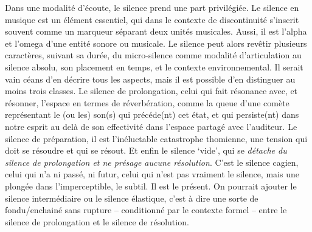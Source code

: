 \documentclass{article}
\begin{document}
Dans une modalité d'écoute, le silence prend une part privilégiée. 
Le silence en musique est un élément essentiel, qui dans le contexte de discontinuité s'inscrit souvent comme un marqueur séparant deux unités musicales. Aussi, il est l'alpha et l'omega d'une entité sonore ou musicale. Le silence peut alors revêtir plusieurs caractères, suivant sa durée, du micro-silence comme modalité d'articulation au silence absolu, son placement en temps, et le contexte environnemental. Il serait vain céans d'en décrire tous les aspects, mais il est possible d'en distinguer au moins trois classes. Le silence de prolongation, celui qui fait résonance avec, et résonner, l'espace en termes de réverbération, comme la queue d'une comète représentant le (ou les) son(s) qui précéde(nt) cet état, et qui persiste(nt) dans notre esprit au delà de son effectivité dans l'espace partagé avec l'auditeur. %
Le silence de préparation, il est l'inéluctable catastrophe thomienne\label{efn:thom}, une tension qui doit se résoudre et qui se résout. Et enfin le silence `vide', qui se \textit{détache du silence de prolongation et ne présage aucune résolution}. C'est le silence cagien, celui qui n'a ni passé, ni futur, celui qui n'est pas vraiment le silence, mais une plongée dans l'imperceptible, le subtil. Il est le présent.
On pourrait ajouter le silence intermédiaire ou le silence élastique, c'est à dire une sorte de fondu/enchainé sans rupture -- conditionné par le contexte formel -- entre le silence de prolongation et le silence de résolution.
\end{document}
